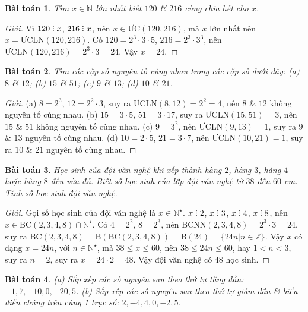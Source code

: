 \documentclass[11pt]{article}
\numberwithin{equation}{section}
\newtheorem{baitoan}{Bài toán}[section]
\DeclareRobustCommand{\divby}{%
	\mathrel{\vbox{\baselineskip.65ex\lineskiplimit0pt\hbox{.}\hbox{.}\hbox{.}}}%
}
\begin{document}
\begin{baitoan}
	Tìm $x\in\mathbb{N}$ lớn nhất biết $120$ \& $216$ cùng chia hết cho $x$.
\end{baitoan}

\begin{proof}[Giải]
	Vì $120\divby x$, $216\divby x$, nên $x\in\mbox{ƯC}(120,216)$, mà $x$ lớn nhất nên $x = \mbox{ƯCLN}(120,216)$. Có $120 = 2^3\cdot3\cdot5$, $216 = 2^3\cdot3^3$, nên $\mbox{ƯCLN}(120,216) = 2^3\cdot3 = 24$. Vậy $x = 24$.
\end{proof}

\begin{baitoan}
	Tìm các cặp số nguyên tố cùng nhau trong các cặp số dưới đây: (a) $8$ \& $12$; (b) $15$ \& $51$; (c) $9$ \& $13$; (d) $10$ \& $21$.
\end{baitoan}

\begin{proof}[Giải]
	(a) $8 = 2^3$, $12 = 2^2\cdot3$, suy ra $\mbox{ƯCLN}(8,12) = 2^2 = 4$, nên $8$ \& $12$ không nguyên tố cùng nhau. (b) $15 = 3\cdot5$, $51 = 3\cdot17$, suy ra $\mbox{ƯCLN}(15,51) = 3$, nên $15$ \& $51$ không nguyên tố cùng nhau. (c) $9 = 3^2$, nên $\mbox{ƯCLN}(9,13) = 1$, suy ra $9$ \& $13$ nguyên tố cùng nhau. (d) $10 = 2\cdot5$, $21 = 3\cdot7$, nên $\mbox{ƯCLN}(10,21) = 1$, suy ra $10$ \& $21$ nguyên tố cùng nhau.
\end{proof}

\begin{baitoan}
	Học sinh của đội văn nghệ khi xếp thành hàng $2$, hàng $3$, hàng $4$ hoặc hàng $8$ đều vừa đủ. Biết số học sinh của lớp đội văn nghệ từ $38$ đến $60$ em. Tính số học sinh đội văn nghệ.
\end{baitoan}

\begin{proof}[Giải]
	Gọi số học sinh của đội văn nghệ là $x\in\mathbb{N}^\star$. $x\divby2$, $x\divby3$, $x\divby4$, $x\divby8$, nên $x\in\mbox{BC}(2,3,4,8)\cap\mathbb{N}^\star$. Có $4 = 2^2$, $8 = 2^3$, nên $\mbox{BCNN}(2,3,4,8) = 2^3\cdot3 = 24$, suy ra $\mbox{BC}(2,3,4,8) = \mbox{B}(\mbox{BC}(2,3,4,8)) = \mbox{B}(24) = \{24n|n\in\mathbb{Z}\}$. Vậy $x$ có dạng $x = 24n$, với $n\in\mathbb{N}^\star$, mà $38\le x\le 60$, nên $38\le 24n\le60$, hay $1 < n < 3$, suy ra $n = 2$, suy ra $x = 24\cdot 2 = 48$. Vậy đội văn nghệ có $48$ học sinh.
\end{proof}

\begin{baitoan}
	(a) Sắp xếp các số nguyên sau theo thứ tự tăng dần: $-1,7,-10,0,-20,5$. (b) Sắp xếp các số nguyên sau theo thứ tự giảm dần \& biểu diễn chúng trên cùng 1 trục số: $2,-4,4,0,-2,5$.
\end{baitoan}
\end{document}
